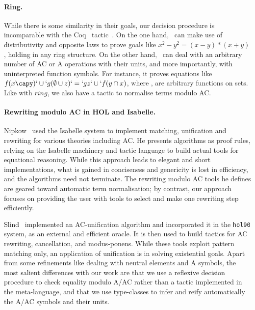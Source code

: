 \documentclass{llncs}
\begin{document}
\paragraph{Ring.}

While there is some similarity in their goals, our decision procedure
is incomparable with the Coq \ring\
tactic~\cite{gregoire-mahboubi-05}. On the one hand, \ring\ can make
use of distributivity and opposite laws to prove goals like
\coqinline$x^2-y^2 = (x-y)*(x+y)$, holding in any ring structure.
On the other hand, \tac\ can deal with an arbitrary number of AC or A
operations with their units, and more importantly, with uninterpreted
function symbols. For instance, it proves equations like
\coqinline$f(x\capy)`\cup`g(\emptyset\cup z)`=`g z`\cup`f(y\cap x)$, where
\code{f}, \code{g} are arbitrary functions on sets.
Like with \coqinline$ring$, we also have a tactic to normalise terms modulo
AC.

\paragraph{Rewriting modulo AC in HOL and Isabelle.}

Nipkow~\cite{nipkow-er} used the Isabelle system to implement
matching, unification and rewriting for various theories including AC.
He presents algorithms as proof rules, relying on the Isabelle
machinery and tactic language to build actual tools for equational
reasoning. While this approach leads to elegant and short
implementations, what is gained in conciseness and genericity is lost
in efficiency, and the algorithms need not terminate. 
The rewriting modulo AC tools he defines are geared toward automatic
term normalisation; by contrast, our approach focuses on providing the
user with tools to select and make one rewriting step efficiently.

Slind~\cite{slind} implemented an AC-unification algorithm and
incorporated it in the {\tt hol90} system, as an external and efficient
oracle. It is then used to build tactics for AC rewriting,
cancellation, and modus-ponens.
While these tools exploit pattern matching only, an application of
unification is in solving existential goals. 
Apart from some refinements like dealing with neutral elements and A
symbols, the most salient differences with our work are that we
use a reflexive decision procedure to check equality modulo A/AC
rather than a tactic implemented in the meta-language, and that we use
type-classes to infer and reify automatically the A/AC symbols and
their units.
\end{document}

